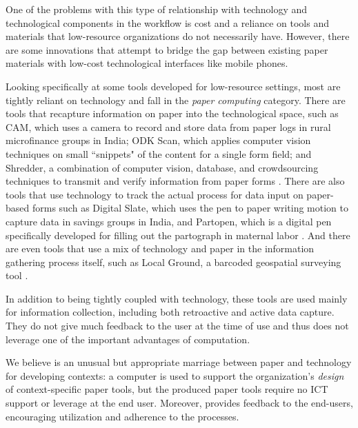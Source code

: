 \documentclass{sig-alternate}
\begin{document}
One of the problems with this type of relationship with technology and technological components in the workflow is cost and a reliance on tools and materials that low-resource organizations do not necessarily have. However, there are some innovations that attempt to bridge the gap between existing paper materials with low-cost technological interfaces like mobile phones.

Looking specifically at some tools developed for low-resource settings, most are tightly reliant on technology and fall in the \emph{paper computing} category. There are tools that recapture information on paper into the technological space, such as CAM, which uses a camera to record and store data from paper logs in rural microfinance groups in India; ODK Scan, which applies computer vision techniques on small ``snippets" of the content for a single form field; and Shredder, a combination of computer vision, database, and crowdsourcing techniques to transmit and verify information from paper forms \cite{parikh2006, akona2009, dell2012, dell2013, chen2012}. There are also tools that use technology to track the actual process for data input on paper-based forms such as Digital Slate, which uses the pen to paper writing motion to capture data in savings groups in India, and Partopen, which is a digital pen specifically developed for filling out the partograph in maternal labor \cite{ratan2010, underwood2012, underwood2013}. And there are even tools that use a mix of technology and paper in the information gathering process itself, such as Local Ground, a barcoded geospatial surveying tool \cite{wart2010}.

In addition to being tightly coupled with technology, these tools are used mainly for information collection, including both retroactive and active data capture. They do not give much feedback to the user at the time of use and thus does not leverage one of the important advantages of computation.

We believe \nifty is an unusual but appropriate marriage between paper and technology for developing contexts: a computer is used to support the organization's \emph{design} of context-specific paper tools, but the produced paper tools require no ICT support or leverage at the end user. Moreover, \nifty provides feedback to the end-users, encouraging utilization and adherence to the processes.

\end{document}
